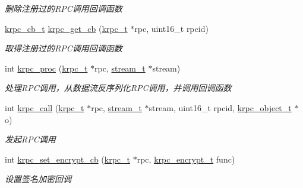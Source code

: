 \begin{DoxyCompactItemize}
\begin{DoxyCompactList}\small\item\em 删除注册过的\+R\+P\+C调用回调函数 \end{DoxyCompactList}\item 
\hyperlink{a00047_a06bb708c1b97445d3a5d0c1b32ad2ab6_a06bb708c1b97445d3a5d0c1b32ad2ab6}{krpc\+\_\+cb\+\_\+t} \hyperlink{a00077_a7841a0b4c828efcb607a51bbdd9c9ab1_a7841a0b4c828efcb607a51bbdd9c9ab1}{krpc\+\_\+get\+\_\+cb} (\hyperlink{a00047_a1e414ac6f6de24462ccf81e10f63428d_a1e414ac6f6de24462ccf81e10f63428d}{krpc\+\_\+t} $\ast$rpc, uint16\+\_\+t rpcid)
\begin{DoxyCompactList}\small\item\em 取得注册过的\+R\+P\+C调用回调函数 \end{DoxyCompactList}\item 
int \hyperlink{a00077_a9c94cce18fdcbb5e184af7f2ea20cceb_a9c94cce18fdcbb5e184af7f2ea20cceb}{krpc\+\_\+proc} (\hyperlink{a00047_a1e414ac6f6de24462ccf81e10f63428d_a1e414ac6f6de24462ccf81e10f63428d}{krpc\+\_\+t} $\ast$rpc, \hyperlink{a00047_a261dba04f46f5c59a68a05f69f5a65a8_a261dba04f46f5c59a68a05f69f5a65a8}{stream\+\_\+t} $\ast$stream)
\begin{DoxyCompactList}\small\item\em 处理\+R\+P\+C调用，从数据流反序列化\+R\+P\+C调用，并调用回调函数 \end{DoxyCompactList}\item 
int \hyperlink{a00077_a51bbf2caf4916c0c08d8c8d8d86e562e_a51bbf2caf4916c0c08d8c8d8d86e562e}{krpc\+\_\+call} (\hyperlink{a00047_a1e414ac6f6de24462ccf81e10f63428d_a1e414ac6f6de24462ccf81e10f63428d}{krpc\+\_\+t} $\ast$rpc, \hyperlink{a00047_a261dba04f46f5c59a68a05f69f5a65a8_a261dba04f46f5c59a68a05f69f5a65a8}{stream\+\_\+t} $\ast$stream, uint16\+\_\+t rpcid, \hyperlink{a00047_a9c07dfc8c3b965f75b09f82fdb1bbb1e_a9c07dfc8c3b965f75b09f82fdb1bbb1e}{krpc\+\_\+object\+\_\+t} $\ast$o)
\begin{DoxyCompactList}\small\item\em 发起\+R\+P\+C调用 \end{DoxyCompactList}\item 
int \hyperlink{a00077_a5317bb571cb4d94bc56b83989c1b10c2_a5317bb571cb4d94bc56b83989c1b10c2}{krpc\+\_\+set\+\_\+encrypt\+\_\+cb} (\hyperlink{a00047_a1e414ac6f6de24462ccf81e10f63428d_a1e414ac6f6de24462ccf81e10f63428d}{krpc\+\_\+t} $\ast$rpc, \hyperlink{a00047_ae41a67cc07f8dff897ca978e03b1f2d7_ae41a67cc07f8dff897ca978e03b1f2d7}{krpc\+\_\+encrypt\+\_\+t} func)
\begin{DoxyCompactList}\small\item\em 设置签名加密回调 \end{DoxyCompactList}\item 

\end{DoxyCompactItemize}
